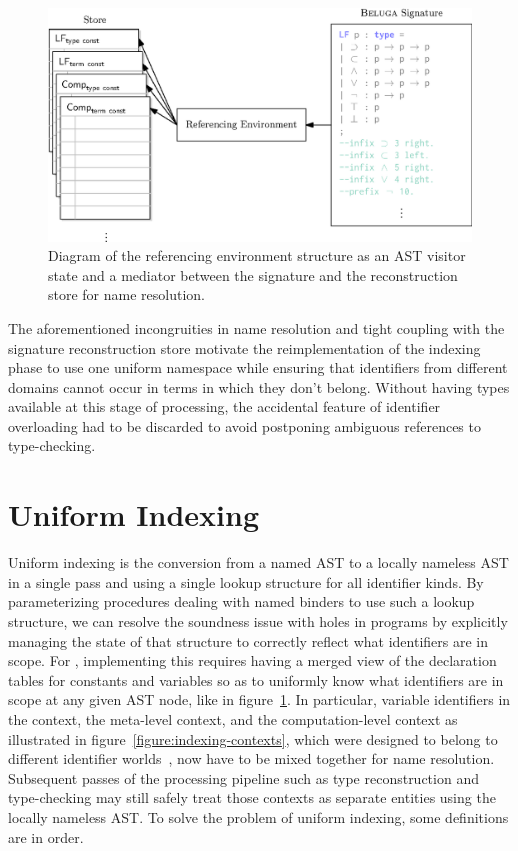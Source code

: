 \begin{figure}[htb]
\centering
\includegraphics{figures/referencing-environment-architecture.eps}
\caption[Role of the referencing environment in \Beluga]{%
Diagram of the referencing environment structure as an \ac{AST} visitor state and a mediator between the \Beluga signature and the reconstruction store for name resolution.
}
\label{figure:referencing-environment-architecture}
\end{figure}

The aforementioned incongruities in name resolution and tight coupling with the signature reconstruction store motivate the reimplementation of the indexing phase to use one uniform namespace while ensuring that identifiers from different domains cannot occur in terms in which they don't belong.
Without having types available at this stage of processing, the accidental feature of identifier overloading had to be discarded to avoid postponing ambiguous references to type-checking.

\section{Uniform Indexing}\label{section:indexing}


Uniform indexing is the conversion from a named \ac{AST} to a locally nameless \ac{AST} in a single pass and using a single lookup structure for all identifier kinds.
By parameterizing procedures dealing with named binders to use such a lookup structure, we can resolve the soundness issue with holes in programs by explicitly managing the state of that structure to correctly reflect what identifiers are in scope.
For \Beluga, implementing this requires having a merged view of the declaration tables for constants and variables so as to uniformly know what identifiers are in scope at any given \ac{AST} node, like in figure~\ref{figure:referencing-environment-architecture}.
In particular, variable identifiers in the \LF context, the meta-level context, and the computation-level context as illustrated in figure~\ref{figure:indexing-contexts}, which were designed to belong to different identifier worlds~\cite{ferreira2012compiler}, now have to be mixed together for name resolution.
Subsequent passes of the processing pipeline such as type reconstruction and type-checking may still safely treat those contexts as separate entities using the locally nameless \ac{AST}.
To solve the problem of uniform indexing, some definitions are in order.

